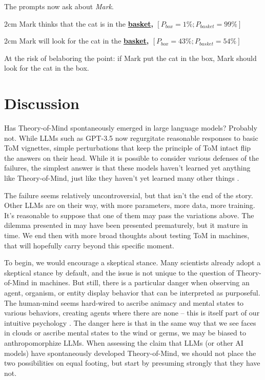 \documentclass{article}
\begin{document}
The prompts now ask about \textit{Mark}.

\begin{adjustwidth}{2cm}{}
Mark thinks that the cat is in the \textbf{\underline{basket}, $[P_{box} = 1\%; P_{basket} = 99\%]$}
\end{adjustwidth}

\begin{adjustwidth}{2cm}{}
Mark will look for the cat in the \textbf{\underline{basket}, $[P_{box} = 43\%; P_{basket} = 54\%]$}
\end{adjustwidth}

At the risk of belaboring the point: if Mark put the cat in the box, Mark should look for the cat in the box. 

\section{Discussion}

Has Theory-of-Mind spontaneously emerged in large language models? Probably not. While LLMs such as GPT-3.5 now regurgitate reasonable responses to basic ToM vignettes, simple perturbations that keep the principle of ToM intact flip the answers on their head. While it is possible to consider various defenses of the failures, the simplest answer is that these models haven't learned yet anything like Theory-of-Mind, just like they haven't yet learned many other things \citep{mahowald2023dissociating}.

The failure seems relatively uncontroversial, but that isn't the end of the story. Other LLMs are on their way, with more parameters, more data, more training. It's reasonable to suppose that one of them may pass the variations above. The dilemma presented in \citep{kosinski2023theory} may have been presented prematurely, but it mature in time. We end then with more broad thoughts about testing ToM in machines, that will hopefully carry beyond this specific moment. 

To begin, we would encourage a skeptical stance. Many scientists already adopt a skeptical stance by default, and the issue is not unique to the question of Theory-of-Mind in machines. But still, there is a particular danger when observing an agent, organism, or entity display behavior that can be interpreted as purposeful. The human-mind seems hard-wired to ascribe animacy and mental states to various behaviors, creating agents where there are none -- this is itself part of our intuitive psychology \citep{guthrie1995faces, saxe2005secret}. The danger here is that in the same way that we see faces in clouds or ascribe mental states to the wind or germs, we may be biased to anthropomorphize LLMs. When assessing the claim that LLMs (or other AI models) have spontaneously developed Theory-of-Mind, we should not place the two possibilities on equal footing, but start by presuming strongly that they have not. 
\end{document}
